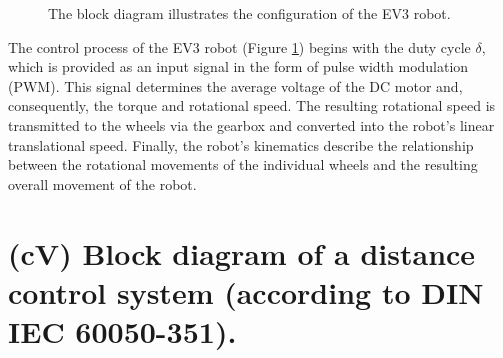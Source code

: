 \documentclass[12pt, oneside, a4paper]{scrreprt}
\begin{document}
\begin{figure}[H]
                \caption{The block diagram illustrates the configuration of the EV3 robot.}
                \label{fig:ev3_blockdiagramm}
            \end{figure}

        The control process of the EV3 robot (Figure \ref{fig:ev3_blockdiagramm}) begins with the duty cycle $\delta$, which is provided as an input signal in the form of pulse width modulation (PWM). This signal determines the average voltage of the DC motor and, consequently, the torque and rotational speed. The resulting rotational speed is transmitted to the wheels via the gearbox and converted into the robot's linear translational speed. Finally, the robot's kinematics describe the relationship between the rotational movements of the individual wheels and the resulting overall movement of the robot.


        \section{(cV) Block diagram of a distance control system (according to DIN IEC 60050-351).}\label{sec:cV}
\end{document}
